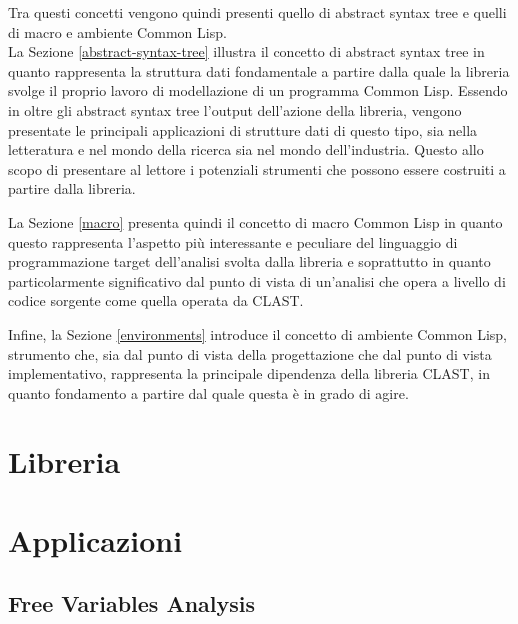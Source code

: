 \documentclass{book}
\begin{document}
Tra questi concetti vengono quindi presenti quello di abstract syntax tree e
quelli di macro e ambiente Common Lisp.\\

La Sezione \ref{abstract-syntax-tree} illustra il concetto di abstract syntax
tree in quanto rappresenta la struttura dati fondamentale a partire dalla quale
la libreria svolge il proprio lavoro di modellazione di un programma Common
Lisp. Essendo in oltre gli abstract syntax tree l'output dell'azione della
libreria, vengono presentate le principali applicazioni di strutture dati di
questo tipo, sia nella letteratura e nel mondo della ricerca sia nel mondo
dell'industria. Questo allo scopo di presentare al lettore i potenziali
strumenti che possono essere costruiti a partire dalla libreria.

La Sezione \ref{macro} presenta quindi il concetto di macro Common Lisp in
quanto questo rappresenta l'aspetto più interessante e peculiare del linguaggio
di programmazione target dell'analisi svolta dalla libreria e soprattutto in
quanto particolarmente significativo dal punto di vista di un'analisi che opera
a livello di codice sorgente come quella operata da CLAST.

Infine, la Sezione \ref{environments} introduce il concetto di ambiente Common
Lisp, strumento che, sia dal punto di vista della progettazione che dal punto di
vista implementativo, rappresenta la principale dipendenza della libreria CLAST,
in quanto fondamento a partire dal quale questa è in grado di agire.






\endgroup

\chapter{Libreria}
\label{library}





\chapter{Applicazioni}
\label{applications}
\section{Free Variables Analysis}
\end{document}
